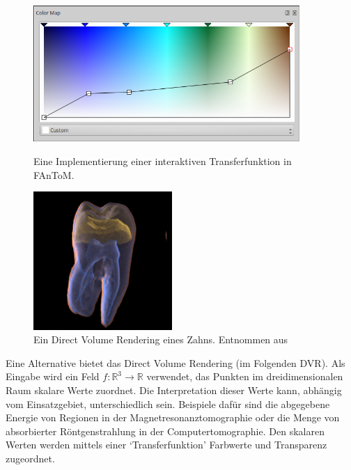 \documentclass[a4paper,fontsize=12pt,toc=bib,halfparskip]{scrartcl}
\begin{document}
\begin{figure}
	\begin{minipage}{0.5\textwidth}
		\centering
		\includegraphics[width=0.9\textwidth]{pictures/Colormap.png}
		\caption{Eine Implementierung einer interaktiven Transferfunktion in FAnToM. }
		\label{Colormap}
	\end{minipage}
	\hspace{0.5cm}
	\begin{minipage}{0.5\textwidth}
		\centering
		\includegraphics[width=0.47\textwidth]{pictures/Zahn.png}
		\caption{Ein Direct Volume Rendering eines Zahns. Entnommen aus \cite[S.~6]{drebin1988volume}}
		\label{Zahn}
	\end{minipage}
\end{figure}
Eine Alternative bietet das Direct Volume Rendering\cite{drebin1988volume} (im Folgenden DVR). Als Eingabe wird ein Feld $f: \mathbb{R}^3\rightarrow\mathbb{R}$ verwendet, das Punkten im dreidimensionalen Raum skalare Werte zuordnet. Die Interpretation dieser Werte kann, abh\"angig vom Einsatzgebiet, unterschiedlich sein. Beispiele daf\"ur sind die abgegebene Energie von Regionen in der Magnetresonanztomographie oder die Menge von absorbierter R\"ontgenstrahlung in der Computertomographie. Den skalaren Werten werden mittels einer `Transferfunktion' Farbwerte und Transparenz zugeordnet.
\end{document}
